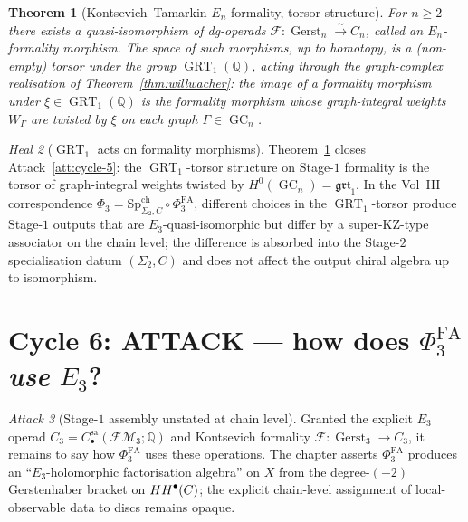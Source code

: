 \documentclass[11pt]{article}
\newtheorem{theorem}{Theorem}[section]
\theoremstyle{definition}
\theoremstyle{remark}
\newtheorem{attack}[theorem]{Attack}
\newtheorem{heal}[theorem]{Heal}
\DeclareMathOperator{\HH}{HH}
\DeclareMathOperator{\Gerst}{Gerst}
\DeclareMathOperator{\GC}{GC}
\DeclareMathOperator{\GRT}{GRT}
\newcommand{\FM}{\mathcal{FM}}
\newcommand{\PhiFA}{\Phi^{\mathrm{FA}}}
\newcommand{\SpCh}{\mathrm{Sp}^{\mathrm{ch}}}
\begin{document}
\begin{theorem}[Kontsevich--Tamarkin $E_n$-formality, torsor structure]
\label{thm:kt-formality}
For $n \geq 2$ there exists a quasi-isomorphism of dg-operads
$\mathcal{F} \colon \Gerst_n \xrightarrow{\sim} C_n$, called an
$E_n$-formality morphism. The space of such morphisms, up to
homotopy, is a (non-empty) torsor under the group
$\GRT_1(\mathbb{Q})$, acting through the graph-complex realisation
of Theorem~\ref{thm:willwacher}: the image of a formality morphism
under $\xi \in \GRT_1(\mathbb{Q})$ is the formality morphism whose
graph-integral weights $W_\Gamma$ are twisted by $\xi$ on each graph
$\Gamma \in \GC_n$.
\end{theorem}

\begin{heal}[$\GRT_1$ acts on formality morphisms]
\label{heal:cycle-5}
Theorem~\ref{thm:kt-formality} closes Attack~\ref{att:cycle-5}: the
$\GRT_1$-torsor structure on Stage-$1$ formality is the torsor of
graph-integral weights twisted by $H^0(\GC_n) = \mathfrak{grt}_1$.
In the Vol~III correspondence $\Phi_3 = \SpCh_{\Sigma_2, C} \circ
\PhiFA_3$, different choices in the $\GRT_1$-torsor produce
Stage-$1$ outputs that are $E_3$-quasi-isomorphic but differ by
a super-KZ-type associator on the chain level; the difference is
absorbed into the Stage-$2$ specialisation datum $(\Sigma_2, C)$ and
does not affect the output chiral algebra up to isomorphism.
\end{heal}

\section{Cycle 6: ATTACK --- how does $\PhiFA_3$ \emph{use} $E_3$?}

\begin{attack}[Stage-$1$ assembly unstated at chain level]
\label{att:cycle-6}
Granted the explicit $E_3$ operad $C_3 = C^{\mathrm{sa}}_\bullet(\FM_3; \mathbb{Q})$
and Kontsevich formality $\mathcal{F} \colon \Gerst_3 \to C_3$, it
remains to say how $\PhiFA_3$ uses these operations. The chapter
asserts $\PhiFA_3$ produces an ``$E_3$-holomorphic factorisation
algebra'' on $X$ from the degree-$(-2)$ Gerstenhaber bracket on
$\HH^\bullet(\cC)$; the explicit chain-level assignment of
local-observable data to discs remains opaque.
\end{attack}
\end{document}

